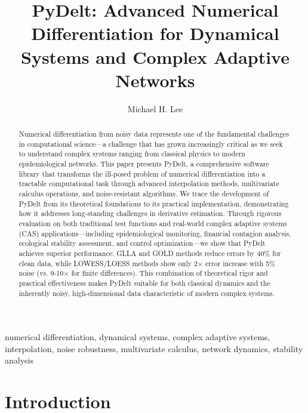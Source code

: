 \documentclass[10pt,journal,compsoc]{IEEEtran}
\begin{document}
\title{PyDelt: Advanced Numerical Differentiation for Dynamical Systems and Complex Adaptive Networks}

\author{Michael H. Lee}


\maketitle

\begin{abstract}
Numerical differentiation from noisy data represents one of the fundamental challenges in computational science---a challenge that has grown increasingly critical as we seek to understand complex systems ranging from classical physics to modern epidemiological networks. This paper presents PyDelt, a comprehensive software library that transforms the ill-posed problem of numerical differentiation into a tractable computational task through advanced interpolation methods, multivariate calculus operations, and noise-resistant algorithms. We trace the development of PyDelt from its theoretical foundations to its practical implementation, demonstrating how it addresses long-standing challenges in derivative estimation. Through rigorous evaluation on both traditional test functions and real-world complex adaptive systems (CAS) applications---including epidemiological monitoring, financial contagion analysis, ecological stability assessment, and control optimization---we show that PyDelt achieves superior performance: GLLA and GOLD methods reduce errors by 40\% for clean data, while LOWESS/LOESS methods show only 2× error increase with 5\% noise (vs. 9-10× for finite differences). This combination of theoretical rigor and practical effectiveness makes PyDelt suitable for both classical dynamics and the inherently noisy, high-dimensional data characteristic of modern complex systems.
\end{abstract}

\begin{IEEEkeywords}
numerical differentiation, dynamical systems, complex adaptive systems, interpolation, noise robustness, multivariate calculus, network dynamics, stability analysis
\end{IEEEkeywords}

\section{Introduction}
\end{document}
